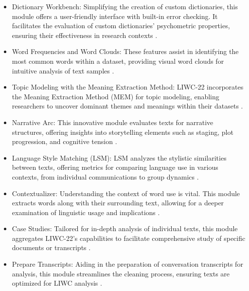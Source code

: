 \begin{itemize}
\item Dictionary Workbench: Simplifying the creation of custom dictionaries, this module offers a user-friendly interface with built-in error checking. It facilitates the evaluation of custom dictionaries' psychometric properties, ensuring their effectiveness in research contexts \cite{boyd2022development}.

\item Word Frequencies and Word Clouds: These features assist in identifying the most common words within a dataset, providing visual word clouds for intuitive analysis of text samples \cite{boyd2022development}.

\item Topic Modeling with the Meaning Extraction Method: LIWC-22 incorporates the Meaning Extraction Method (MEM) for topic modeling, enabling researchers to uncover dominant themes and meanings within their datasets \cite{boyd2022development}.

\item Narrative Arc: This innovative module evaluates texts for narrative structures, offering insights into storytelling elements such as staging, plot progression, and cognitive tension \cite{boyd2022development}.

\item Language Style Matching (LSM): LSM analyzes the stylistic similarities between texts, offering metrics for comparing language use in various contexts, from individual communications to group dynamics \cite{boyd2022development}.

\item Contextualizer: Understanding the context of word use is vital. This module extracts words along with their surrounding text, allowing for a deeper examination of linguistic usage and implications \cite{boyd2022development}.

\item Case Studies: Tailored for in-depth analysis of individual texts, this module aggregates LIWC-22's capabilities to facilitate comprehensive study of specific documents or transcripts \cite{boyd2022development}.

\item Prepare Transcripts: Aiding in the preparation of conversation transcripts for analysis, this module streamlines the cleaning process, ensuring texts are optimized for LIWC analysis \cite{boyd2022development}.
\end{itemize}

